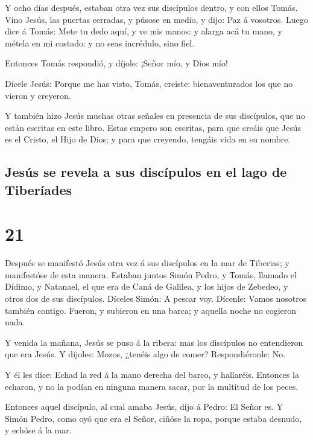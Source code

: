  Y ocho días después, estaban otra vez sus discípulos
dentro, y con ellos Tomás. Vino Jesús, las puertas cerradas, y púsose en
medio, y dijo: Paz á vosotros.  Luego dice á Tomás: Mete
tu dedo aquí, y ve mis manos: y alarga acá tu mano, y métela en mi
costado: y no seas incrédulo, sino fiel.

 Entonces Tomás respondió, y díjole: ¡Señor mío, y Dios
mío!

 Dícele Jesús: Porque me has visto, Tomás, creiste:
bienaventurados los que no vieron y creyeron.

 Y también hizo Jesús muchas otras señales en presencia
de sus discípulos, que no están escritas en este libro. 
Estas empero son escritas, para que creáis que Jesús es el Cristo, el
Hijo de Dios; y para que creyendo, tengáis vida en su nombre.

\hypertarget{jesuxfas-se-revela-a-sus-discuxedpulos-en-el-lago-de-tiberuxedades}{%
\subsection{Jesús se revela a sus discípulos en el lago de
Tiberíades}\label{jesuxfas-se-revela-a-sus-discuxedpulos-en-el-lago-de-tiberuxedades}}

\hypertarget{section-43-21}{%
\section{21}\label{section-43-21}}

 Después se manifestó Jesús otra vez á sus discípulos en
la mar de Tiberias; y manifestóse de esta manera.  Estaban
juntos Simón Pedro, y Tomás, llamado el Dídimo, y Natanael, el que era
de Caná de Galilea, y los hijos de Zebedeo, y otros dos de sus
discípulos.  Díceles Simón: A pescar voy. Dícenle: Vamos
nosotros también contigo. Fueron, y subieron en una barca; y aquella
noche no cogieron nada.

 Y venida la mañana, Jesús se puso á la ribera: mas los
discípulos no entendieron que era Jesús.  Y díjoles:
Mozos, ¿tenéis algo de comer? Respondiéronle: No.

 Y él les dice: Echad la red á la mano derecha del barco,
y hallaréis. Entonces la echaron, y no la podían en ninguna manera
sacar, por la multitud de los peces.

 Entonces aquel discípulo, al cual amaba Jesús, dijo á
Pedro: El Señor es. Y Simón Pedro, como oyó que era el Señor, ciñóse la
ropa, porque estaba desnudo, y echóse á la mar.

